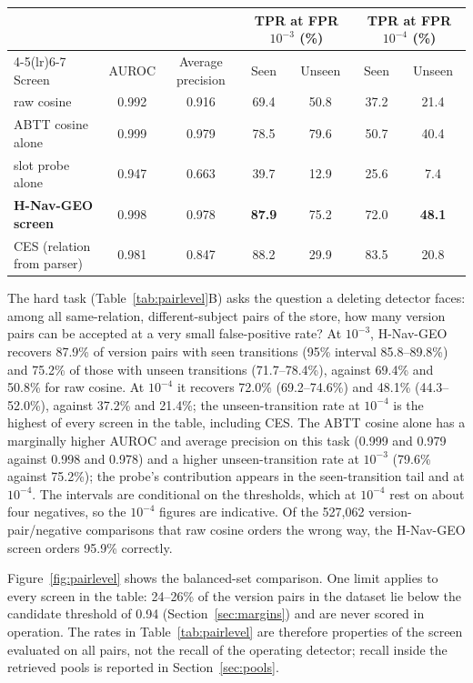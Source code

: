 \documentclass{CUP-JNL-NLP}
\newcommand{\geo}{H-Nav-GEO}
\begin{document}
\begin{table}[tbp]
{\begin{tabular}{lcccccc}
 & & & \multicolumn{2}{c}{TPR at FPR $10^{-3}$ (\%)} & \multicolumn{2}{c}{TPR at FPR $10^{-4}$ (\%)}\\
\cmidrule(lr){4-5}\cmidrule(lr){6-7}
Screen & AUROC & Average precision & Seen & Unseen & Seen & Unseen\\\midrule
raw cosine & 0.992 & 0.916 & 69.4 & 50.8 & 37.2 & 21.4\\
ABTT cosine alone & 0.999 & 0.979 & 78.5 & 79.6 & 50.7 & 40.4\\
slot probe alone & 0.947 & 0.663 & 39.7 & 12.9 & 25.6 & 7.4\\
\textbf{\geo{} screen} & 0.998 & 0.978 & \textbf{87.9} & 75.2 & 72.0 & \textbf{48.1}\\\midrule
CES (relation from parser) & 0.981 & 0.847 & 88.2 & 29.9 & 83.5 & 20.8\\\bottomrule
\end{tabular}}
\end{table}

The hard task (Table~\ref{tab:pairlevel}B) asks the question a deleting detector faces: among all same-relation, different-subject pairs of the store, how many version pairs can be accepted at a very small false-positive rate? At $10^{-3}$, \geo{} recovers 87.9\% of version pairs with seen transitions (95\% interval 85.8--89.8\%) and 75.2\% of those with unseen transitions (71.7--78.4\%), against 69.4\% and 50.8\% for raw cosine. At $10^{-4}$ it recovers 72.0\% (69.2--74.6\%) and 48.1\% (44.3--52.0\%), against 37.2\% and 21.4\%; the unseen-transition rate at $10^{-4}$ is the highest of every screen in the table, including CES. The ABTT cosine alone has a marginally higher AUROC and average precision on this task (0.999 and 0.979 against 0.998 and 0.978) and a higher unseen-transition rate at $10^{-3}$ (79.6\% against 75.2\%); the probe's contribution appears in the seen-transition tail and at $10^{-4}$. The intervals are conditional on the thresholds, which at $10^{-4}$ rest on about four negatives, so the $10^{-4}$ figures are indicative. Of the 527,062 version-pair/negative comparisons that raw cosine orders the wrong way, the \geo{} screen orders 95.9\% correctly.

Figure~\ref{fig:pairlevel} shows the balanced-set comparison. One limit applies to every screen in the table: 24--26\% of the version pairs in the dataset lie below the candidate threshold of 0.94 (Section~\ref{sec:margins}) and are never scored in operation. The rates in Table~\ref{tab:pairlevel} are therefore properties of the screen evaluated on all pairs, not the recall of the operating detector; recall inside the retrieved pools is reported in Section~\ref{sec:pools}.
\end{document}

